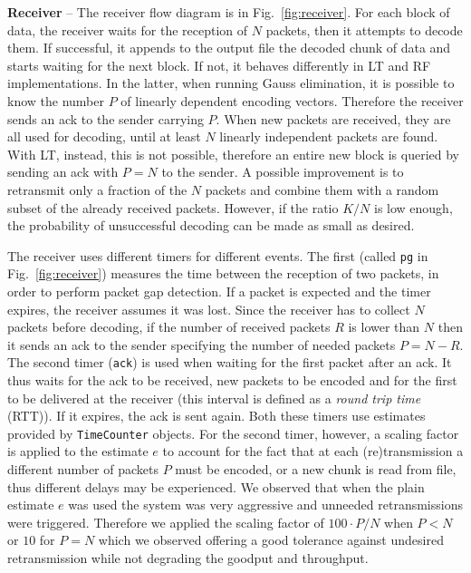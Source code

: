 \textbf{Receiver} -- The receiver flow diagram is in Fig.~\ref{fig:receiver}. 
For each block of data, the receiver waits for the reception of $N$ packets, then it attempts to decode them. If successful, it appends to the output file the decoded chunk of data and starts waiting for the next block. If not, it behaves differently in LT and RF implementations. In the latter, when running Gauss elimination, it is possible to know the number $P$ of linearly dependent encoding vectors. Therefore the receiver sends an ack to the sender carrying $P$. When new packets are received, they are all used for decoding, until at least $N$ %
linearly independent packets are found.
With LT, instead, this is not possible, therefore an entire new block is queried by sending an ack with $P=N$ to the sender. A possible improvement is to retransmit only a fraction of the $N$ packets and combine them with a random subset of the already received packets. However, if the ratio $K/N$ is low enough, the probability of unsuccessful decoding can be made as small as desired. 

The receiver uses different timers for different events. The first (called \texttt{pg} in Fig.~\ref{fig:receiver}) measures the time between the reception of two packets, in order to perform packet gap detection. If a packet is expected and the timer expires, the receiver assumes it was lost. Since the receiver has to collect $N$ packets before decoding, if the number of received packets $R$ is lower than $N$ then it sends an ack to the sender specifying the number of needed packets $P = N - R$. The second timer (\texttt{ack}) is used when waiting for the first packet after an ack. It thus waits for the ack to be received, new packets to be encoded and for the first to be delivered at the receiver (this interval is defined as a \textit{round trip time} (RTT)). If it expires, the ack is sent again. Both these timers use estimates provided by \texttt{TimeCounter} objects. For the second timer, however, a scaling factor is applied to the estimate $e$ to account for the fact that at each (re)transmission a different number of packets $P$ must be encoded, or a new chunk is read from file, thus different delays may be experienced. We observed that when the plain estimate $e$ was used the system was very aggressive and unneeded retransmissions were triggered. Therefore we applied the scaling factor of $100 \cdot P / N$ when $P < N$ or $10$ for $P = N$ which we observed offering a good tolerance against undesired retransmission while not degrading the goodput and throughput.

